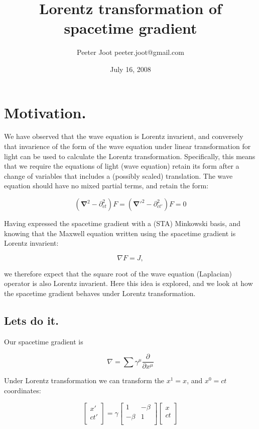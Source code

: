 \documentclass{article}      %
\title{ Lorentz transformation of spacetime gradient }
\author{Peeter Joot \quad peeter.joot@gmail.com}
\date{July 16, 2008}
\newcommand{\spacegrad}[0]{\boldsymbol{\nabla}}
\newcommand{\grad}[0]{\nabla}
\begin{document}

\maketitle{}

\section{ Motivation. }

We have observed that the wave equation is Lorentz invarient, and conversely that invarience of the form of the wave equation under linear transformation for light can be used to calculate the Lorentz transformation.  Specifically, this means that we require the equations of light (wave equation) retain its form after a change of variables that includes
a (possibly scaled) translation.  The wave equation should have no mixed partial terms, and retain the form:

\begin{equation*}
(\spacegrad^2 - \partial_{ct}^2) F = ({\spacegrad'}^2 - \partial_{ct'}^2) F = 0
\end{equation*}

Having expressed the spacetime gradient with a (STA) Minkowski basis, and knowing that the Maxwell equation written using the spacetime gradient is Lorentz invarient:

\begin{equation*}
\grad F = J,
\end{equation*}

we therefore expect that the square root of the wave equation (Laplacian) operator is also Lorentz invarient.  Here this idea is explored, and we look at how the spacetime
gradient behaves under Lorentz transformation.

\subsection{ Lets do it. }

Our spacetime gradient is

\begin{equation*}
\grad = \sum \gamma^{\mu} \frac{\partial}{\partial x^{\mu}}
\end{equation*}

Under Lorentz transformation we can transform the $x^1=x$, and $x^0 = ct$ coordinates:

\begin{equation*}
\begin{bmatrix}
x' \\
ct' \\
\end{bmatrix}
=
\gamma
\begin{bmatrix}
1 & -\beta \\
-\beta & 1 \\
\end{bmatrix}
\begin{bmatrix}
x \\
ct \\
\end{bmatrix}
\end{equation*}
\end{document}
